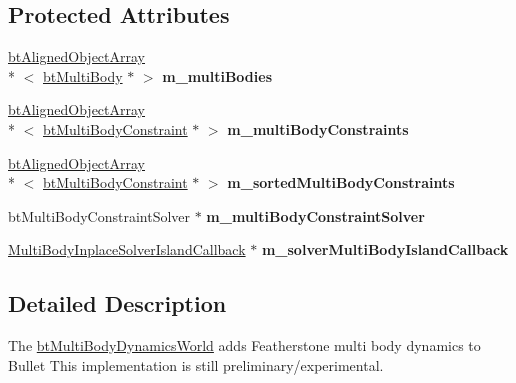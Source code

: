 \subsection*{Protected Attributes}
\begin{DoxyCompactItemize}
\item 
\hypertarget{classbt_multi_body_dynamics_world_a754ab7fa656bb2bb0e86ca809fee1594}{\hyperlink{classbt_aligned_object_array}{bt\+Aligned\+Object\+Array}\\*
$<$ \hyperlink{classbt_multi_body}{bt\+Multi\+Body} $\ast$ $>$ {\bfseries m\+\_\+multi\+Bodies}}\label{classbt_multi_body_dynamics_world_a754ab7fa656bb2bb0e86ca809fee1594}

\item 
\hypertarget{classbt_multi_body_dynamics_world_a08b6183912adb20721a04d73d458072b}{\hyperlink{classbt_aligned_object_array}{bt\+Aligned\+Object\+Array}\\*
$<$ \hyperlink{classbt_multi_body_constraint}{bt\+Multi\+Body\+Constraint} $\ast$ $>$ {\bfseries m\+\_\+multi\+Body\+Constraints}}\label{classbt_multi_body_dynamics_world_a08b6183912adb20721a04d73d458072b}

\item 
\hypertarget{classbt_multi_body_dynamics_world_ad69814f73eddc979ee255391616fa994}{\hyperlink{classbt_aligned_object_array}{bt\+Aligned\+Object\+Array}\\*
$<$ \hyperlink{classbt_multi_body_constraint}{bt\+Multi\+Body\+Constraint} $\ast$ $>$ {\bfseries m\+\_\+sorted\+Multi\+Body\+Constraints}}\label{classbt_multi_body_dynamics_world_ad69814f73eddc979ee255391616fa994}

\item 
\hypertarget{classbt_multi_body_dynamics_world_a6ff4ac983ae4136f8c97eefdb5ea81f8}{bt\+Multi\+Body\+Constraint\+Solver $\ast$ {\bfseries m\+\_\+multi\+Body\+Constraint\+Solver}}\label{classbt_multi_body_dynamics_world_a6ff4ac983ae4136f8c97eefdb5ea81f8}

\item 
\hypertarget{classbt_multi_body_dynamics_world_a3300b222a68aa05d1e0190ae47ab759d}{\hyperlink{struct_multi_body_inplace_solver_island_callback}{Multi\+Body\+Inplace\+Solver\+Island\+Callback} $\ast$ {\bfseries m\+\_\+solver\+Multi\+Body\+Island\+Callback}}\label{classbt_multi_body_dynamics_world_a3300b222a68aa05d1e0190ae47ab759d}

\end{DoxyCompactItemize}


\subsection{Detailed Description}
The \hyperlink{classbt_multi_body_dynamics_world}{bt\+Multi\+Body\+Dynamics\+World} adds Featherstone multi body dynamics to Bullet This implementation is still preliminary/experimental. 

